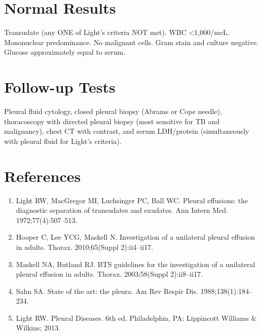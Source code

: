 \section*{Normal Results}
Transudate (any ONE of Light's criteria NOT met). WBC <1,000/mcL. Mononuclear predominance. No malignant cells. Gram stain and culture negative. Glucose approximately equal to serum.
\section*{Follow-up Tests}
Pleural fluid cytology, closed pleural biopsy (Abrams or Cope needle), thoracoscopy with directed pleural biopsy (most sensitive for TB and malignancy), chest CT with contrast, and serum LDH/protein (simultaneously with pleural fluid for Light's criteria).
\section*{References}
\begin{enumerate}
  \item Light RW, MacGregor MI, Luchsinger PC, Ball WC. Pleural effusions: the diagnostic separation of transudates and exudates. Ann Intern Med. 1972;77(4):507--513.
  \item Hooper C, Lee YCG, Maskell N. Investigation of a unilateral pleural effusion in adults. Thorax. 2010;65(Suppl 2):ii4--ii17.
  \item Maskell NA, Butland RJ. BTS guidelines for the investigation of a unilateral pleural effusion in adults. Thorax. 2003;58(Suppl 2):ii8--ii17.
  \item Sahn SA. State of the art: the pleura. Am Rev Respir Dis. 1988;138(1):184--234.
  \item Light RW. Pleural Diseases. 6th ed. Philadelphia, PA: Lippincott Williams \& Wilkins; 2013.
\end{enumerate}
\clearpage
